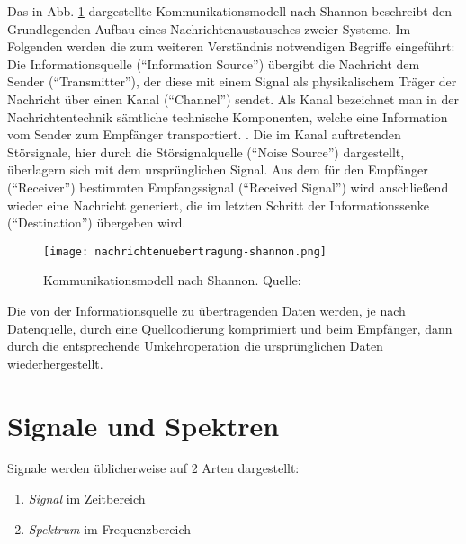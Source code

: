 Das in Abb. \ref{nachrichtenuebertragung} dargestellte Kommunikationsmodell nach Shannon beschreibt den Grundlegenden Aufbau eines Nachrichtenaustausches zweier Systeme. 
Im Folgenden werden die zum weiteren Verständnis notwendigen Begriffe eingeführt:\newline
Die Informationsquelle (\enquote{Information Source}) übergibt die Nachricht dem Sender (\enquote{Transmitter}), der diese mit einem Signal als physikalischem Träger der Nachricht über einen Kanal (\enquote{Channel}) sendet. \newline
Als Kanal bezeichnet man in der Nachrichtentechnik sämtliche technische Komponenten, welche eine Information vom Sender zum Empfänger transportiert. \cite[vgl. Dankmeier, S. 13]{Dankmeier:2017}.\newline
Die im Kanal auftretenden Störsignale, hier durch die Störsignalquelle (\enquote{Noise Source}) dargestellt, überlagern sich mit dem ursprünglichen Signal.\newline
Aus dem für den Empfänger (\enquote{Receiver}) bestimmten Empfangssignal (\enquote{Received Signal}) wird anschließend wieder eine Nachricht generiert, die im letzten Schritt der Informationssenke (\enquote{Destination}) übergeben wird.

\begin{figure}[ht]
	\centering
	\texttt{[image: nachrichtenuebertragung-shannon.png]}
	\caption[Kommunikationsmodell nach Shannon]{Kommunikationsmodell nach Shannon. Quelle: \cite[Werner, S. 11f]{Werner:2017}} 
	\label{nachrichtenuebertragung}
\end{figure}

Die von der Informationsquelle zu übertragenden Daten werden, je nach Datenquelle, durch eine Quellcodierung komprimiert und beim Empfänger, dann durch die entsprechende Umkehroperation die ursprünglichen Daten wiederhergestellt.




\newpage
\section{Signale und Spektren}
Signale werden üblicherweise auf 2 Arten dargestellt:
\begin{enumerate}
	\item  \textit{Signal} im Zeitbereich
	\item  \textit{Spektrum} im Frequenzbereich
\end{enumerate}




